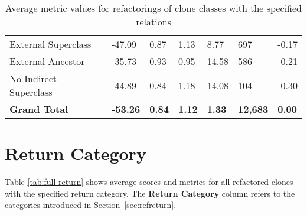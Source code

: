 \begin{appendices}
\begin{table}[H]
{\begin{tabular}{@{}lllllll@{}}
\hspace{10pt} External Superclass & -47.09 & 0.87 & 1.13 & 8.77 & 697 & -0.17 \\
\hspace{10pt} External Ancestor & -35.73 & 0.93 & 0.95 & 14.58 & 586 & -0.21 \\
\hspace{10pt} No Indirect Superclass & -44.89 & 0.84 & 1.18 & 14.08 & 104 & -0.30 \\ \midrule
\textbf{Grand Total} & \textbf{-53.26} & \textbf{0.84} & \textbf{1.12} & \textbf{1.33} & \textbf{12,683} & \textbf{0.00} \\ \bottomrule
\end{tabular}%
}
\caption{Average metric values for refactorings of clone classes with the specified relations}
\label{tab:full-relation}
\end{table}

\section{Return Category}
Table \ref{tab:full-return} shows average scores and metrics for all refactored clones with the specified return category. The \textbf{Return Category} column refers to the categories introduced in Section~\ref{sec:refreturn}.
\begin{table}[H]
\centering
{}
\caption{Average metric values for refactorings of clone classes with the specified return category}
\label{tab:full-return}
\end{table}
\newpage


\end{appendices}
